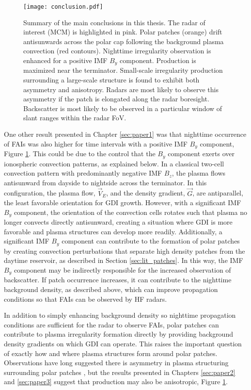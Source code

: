 \begin{figure}
  \texttt{[image: conclusion.pdf]}
  \caption[Irregularity production factors]{Summary of the main conclusions in this thesis.  The radar of interest (MCM) is highlighted in pink.  Polar patches (orange) drift antisunwards across the polar cap following the background plasma convection (red contours).  Nighttime irregularity observation is enhanced for a positive IMF \(B_y\) component.  Production is maximized near the terminator.  Small-scale irregularity production surrounding a large-scale structure is found to exhibit both asymmetry and anisotropy.  Radars are most likely to observe this asymmetry if the patch is elongated along the radar boresight.  Backscatter is most likely to be observed in a particular window of slant ranges within the radar FoV.}
  \label{fig:conclusion}
\end{figure}

One other result presented in Chapter \ref{sec:paper1} was that nighttime occurrence of FAIs was also higher for time intervals with a positive IMF \(B_y\) component, Figure \ref{fig:conclusion}.  This could be due to the control that the \(B_y\) component exerts over ionospheric convection patterns, as explained below.  In a classical two-cell convection pattern with predominantly negative IMF \(B_z\), the plasma flows antisunward from dayside to nightside across the terminator.  In this configuration, the plasma flow, \(\vec{V}_E\), and the density gradient, \(\vec{G}\), are antiparallel, the least favorable orientation for GDI growth.  However, with a significant IMF \(B_y\) component, the orientation of the convection cells rotates such that plasma no longer convects directly antisunward, creating a situation where GDI is more favorable and plasma structures can develop more readily.  Additionally, a significant IMF \(B_y\) component can contribute to the formation of polar patches by creating convection perturbations that separate high density patches from the daytime reservoir, as described in Section \ref{sec:lit_patches}.  In this way, the IMF \(B_y\) component may be indirectly responsible for the increased observation of backscatter.  If patch occurrence increases, it can contribute to the nighttime background density, as described above, which can improve propagation conditions so that FAIs can be observed by 
HF radars.

In addition to simply enhancing background density so nighttime propagation conditions are sufficient for the radar to observe FAIs, polar patches can contribute to plasma irregularity formation directly by providing background density gradients on which GDI can operate.  This raises the important question of exactly how and where plasma structures form around polar patches.  Observations have long suggested there is asymmetry in plasma structuring surrounding polar patches \citep{Weber1984,Milan2002b,Koustov2012}, but the results presented in Chapters \ref{sec:paper2} and \ref{sec:paper3} suggest that production may also be anisotropic, Figure \ref{fig:conclusion}.  


